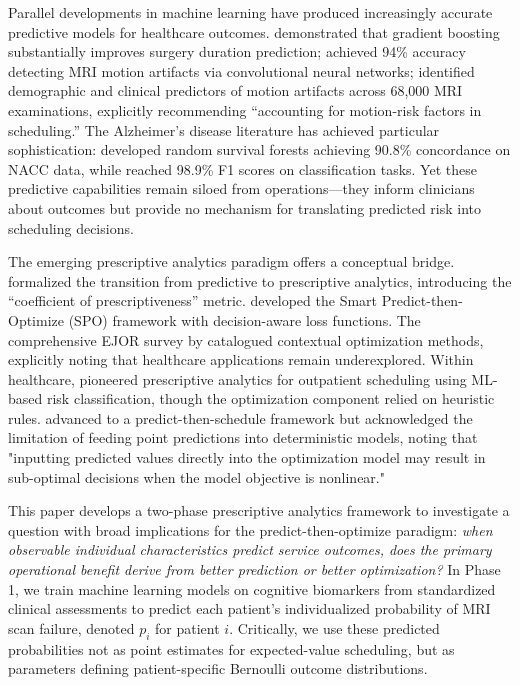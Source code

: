 \documentclass[11pt,a4paper]{article}
\begin{document}
Parallel developments in machine learning have produced increasingly accurate predictive models for healthcare outcomes. \citet{bartek2019improving} demonstrated that gradient boosting substantially improves surgery duration prediction; \citet{vakli2023automatic} achieved 94\% accuracy detecting MRI motion artifacts via convolutional neural networks; \citet{porembka2025disparities} identified demographic and clinical predictors of motion artifacts across 68,000 MRI examinations, explicitly recommending ``accounting for motion-risk factors in scheduling.'' The Alzheimer's disease literature has achieved particular sophistication: \citet{qian2023random} developed random survival forests achieving 90.8\% concordance on NACC data, while \citet{elsappagh2024explainable} reached 98.9\% F1 scores on classification tasks. Yet these predictive capabilities remain siloed from operations---they inform clinicians about outcomes but provide no mechanism for translating predicted risk into scheduling decisions.

The emerging prescriptive analytics paradigm offers a conceptual bridge. \citet{bertsimas2020predictive} formalized the transition from predictive to prescriptive analytics, introducing the ``coefficient of prescriptiveness'' metric. \citet{elmachtoub2022smart} developed the Smart Predict-then-Optimize (SPO) framework with decision-aware loss functions. The comprehensive EJOR survey by \citet{sadana2025contextual} catalogued contextual optimization methods, explicitly noting that healthcare applications remain underexplored. Within healthcare, \citet{srinivas2018prescriptive} pioneered prescriptive analytics for outpatient scheduling using ML-based risk classification, though the optimization component relied on heuristic rules. \citet{salah2022predict} advanced to a predict-then-schedule framework but acknowledged the limitation of feeding point predictions into deterministic models, noting that "inputting predicted values directly into the optimization model may result in sub-optimal decisions when the model objective is nonlinear."

This paper develops a two-phase prescriptive analytics framework to investigate a question with broad implications for the predict-then-optimize paradigm: \textit{when observable individual characteristics predict service outcomes, does the primary operational benefit derive from better prediction or better optimization?} In Phase 1, we train machine learning models on cognitive biomarkers from standardized clinical assessments to predict each patient's individualized probability of MRI scan failure, denoted $p_i$ for patient $i$. Critically, we use these predicted probabilities not as point estimates for expected-value scheduling, but as parameters defining patient-specific Bernoulli outcome distributions.
\end{document}
